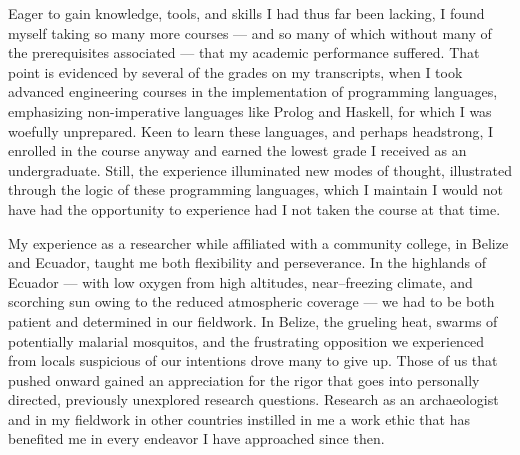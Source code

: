 \documentclass[12pt]{article}
\begin{document}
Eager to gain knowledge,
tools,
and skills I had thus far been lacking,
I found myself taking so many more courses
--- and so many of which without many of the prerequisites associated ---
that my academic performance suffered.
That point is evidenced by several of the grades on my transcripts,
when I took advanced engineering courses in the implementation of programming languages,
emphasizing non-imperative languages like Prolog and Haskell,
for which I was woefully unprepared.
Keen to learn these languages,
and perhaps headstrong,
I enrolled in the course anyway and earned the lowest grade I received as an undergraduate.
Still,
the experience illuminated new modes of thought,
illustrated through the logic of these programming languages,
which I maintain I would not have had the opportunity to experience had I not taken the course at that time.


My experience as a researcher while affiliated with a community college,
in Belize and Ecuador,
taught me both flexibility and perseverance.
In the highlands of Ecuador
--- with low oxygen from high altitudes, near--freezing climate,
and scorching sun owing to the reduced atmospheric coverage ---
we had to be both patient and determined in our fieldwork.
In Belize,
the grueling heat,
swarms of potentially malarial mosquitos,
and the frustrating opposition we experienced from locals suspicious of our intentions drove many to give up.
Those of us that pushed onward gained an appreciation for the rigor that goes into personally directed,
previously unexplored research questions.
Research as an archaeologist and in my fieldwork in other countries instilled in me a work ethic that has benefited me in every endeavor I have approached since then.
\end{document}
